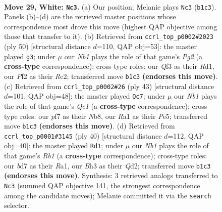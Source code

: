 \documentclass[11pt]{article}
\begin{document}
\clearpage

\begin{figure}[p]\centering
\begin{subfigure}{0.46\textwidth}\centering
\resizebox{\linewidth}{!}{%
\newchessgame
\chessboard[
  setfen={r3r2k/bp1b1pp1/p3p3/3n3P/3q4/BP1p1Q1B/P2P1PKP/RN2R3 w - - 2 29},
  showmover=false,
  pgfstyle=straightmove, color=movearrow, markmove={b1-c3}
]}
\caption{}
\end{subfigure}\hfill
\begin{subfigure}{0.46\textwidth}\centering
\resizebox{\linewidth}{!}{%
\newchessgame
\chessboard[
  setfen={r2r2k1/1b3p2/1q4pp/1P1p4/p1pN4/P1QnPB1P/2R2PP1/3R2K1 w - - 0 26},
  showmover=false,
  pgfstyle=straightmove, color=movearrow, markmove={g2-g3}
]}
\caption{}
\end{subfigure}
\\[4pt]
\begin{subfigure}{0.46\textwidth}\centering
\resizebox{\linewidth}{!}{%
\newchessgame
\chessboard[
  setfen={rnq3kr/1p3pp1/1bbp1n1p/4pP2/1B2P2Q/P2B1N1P/2P1N1P1/3R1R1K b - - 0 22},
  showmover=false,
  pgfstyle=straightmove, color=movearrow, markmove={c8-c7}
]}
\caption{}
\end{subfigure}\hfill
\begin{subfigure}{0.46\textwidth}\centering
\resizebox{\linewidth}{!}{%
\newchessgame
\chessboard[
  setfen={r1r3k1/1pq4p/2np1bp1/1B1b1p2/P2p1P2/1N6/1PPQ1BPP/RR4K1 w - - 3 21},
  showmover=false,
  pgfstyle=straightmove, color=movearrow, markmove={b1-d1}
]}
\caption{}
\end{subfigure}
\caption{\textbf{Move 29, White: \texttt{Nc3}.} (a) Our position; Melanie plays \texttt{Nc3} (\texttt{b1c3}). Panels (b)--(d) are the retrieved master positions whose correspondence most drove this move (highest QAP objective among those that transfer to it). (b) Retrieved from \texttt{ccrl\_top\_p0002\#2023} (ply 50) [structural distance $d$=110, QAP obj=53]: the master played \texttt{g3}; under $\mu$ our \emph{Nb1} plays the role of that game's \emph{Pg2} (a \textbf{cross-type} correspondence); cross-type roles: our \emph{Q}f3 as their \emph{R}d1, our \emph{P}f2 as their \emph{R}c2; transferred move \texttt{b1c3} \textbf{(endorses this move)}. (c) Retrieved from \texttt{ccrl\_top\_p0002\#26} (ply 43) [structural distance $d$=101, QAP obj=48]: the master played \texttt{Qc7}; under $\mu$ our \emph{Nb1} plays the role of that game's \emph{Qc1} (a \textbf{cross-type} correspondence); cross-type roles: our \emph{p}f7 as their \emph{N}b8, our \emph{R}a1 as their \emph{P}e5; transferred move \texttt{b1c3} \textbf{(endorses this move)}. (d) Retrieved from \texttt{ccrl\_top\_p0001\#3145} (ply 40) [structural distance $d$=112, QAP obj=40]: the master played \texttt{Rd1}; under $\mu$ our \emph{Nb1} plays the role of that game's \emph{Rb1} (a \textbf{cross-type} correspondence); cross-type roles: our \emph{b}d7 as their \emph{R}a1, our \emph{B}h3 as their \emph{Q}d2; transferred move \texttt{b1c3} \textbf{(endorses this move)}. Synthesis: 3 retrieved analogs transferred to \texttt{Nc3} (summed QAP objective 141, the strongest correspondence among the candidate moves); Melanie committed it via the \texttt{search} selector.}
\label{fig:thought-m56}
\end{figure}
\end{document}
